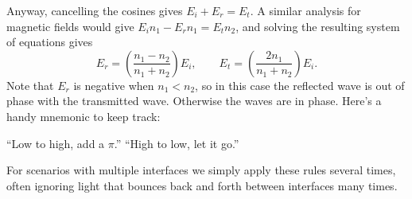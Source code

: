 \documentclass[../p051main.tex]{subfiles}
\begin{document}
Anyway, cancelling the cosines gives $E_i + E_r = E_t$.
A similar analysis for magnetic fields would give $E_i n_1 - E_r n_1 = E_t n_2$, and solving the resulting system of equations gives
\[ E_r = \left( \frac{n_1 - n_2}{n_1 + n_2} \right) E_i, \qquad E_t = \left( \frac{2n_1}{n_1 + n_2} \right) E_i.  \]
Note that $E_r$ is negative when $n_1 < n_2$, so in this case the reflected wave is out of phase with the transmitted wave.
Otherwise the waves are in phase.
Here's a handy mnemonic to keep track:
\begin{center}
    ``Low to high, add a $\pi$.'' \qquad ``High to low, let it go.''
\end{center}
For scenarios with multiple interfaces we simply apply these rules several times, often ignoring light that bounces back and forth between interfaces many times.
\end{document}
